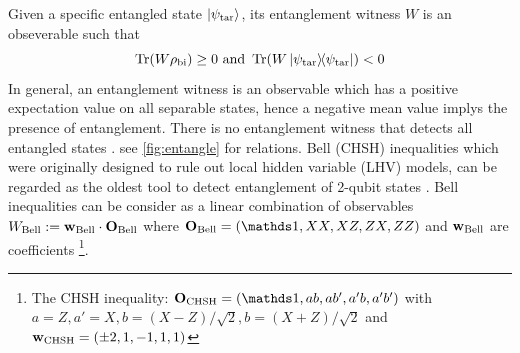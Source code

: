 \documentclass[
reprint,
aps,
pra,
floatfix,
]{revtex4-2}
\theoremstyle{plain}
\theoremstyle{definition}
\newtheorem{definition}{Definition}
\newtheorem{remark}{Remark}
\newcommand{\ew}{W}
\newcommand{\pob}{O}
\newcommand{\dm}{\rho}
\newcommand{\bi}{\text{bi}}
\newcommand{\target}{\textup{tar}}
\newcommand{\chsh}{\textup{CHSH}}
\newcommand{\bellineq}{\textup{Bell}}
\newcommand{\px}{X}
\newcommand{\pz}{Z}
\begin{document}
Given a specific entangled state $\ket{\psi_\target}$, its entanglement witness $\ew$ is an obseverable such that
\begin{equation}
	\Tr(\ew\dm_{\bi}) \ge 0  \text{ and }
	\Tr(\ew\op{\psi_{\target}}) < 0 
\end{equation}
In general, an entanglement witness is an observable which has a positive expectation value on all separable states, hence a negative mean value implys the presence of entanglement.
There is no entanglement witness that detects all entangled states \cite{heinosaariMathematicalLanguageQuantum2011}.
see \cref{fig:entangle} for relations.
Bell (CHSH) inequalities which were originally designed to rule out local hidden variable (LHV) models,
can be regarded as the oldest tool to detect entanglement of 2-qubit states \cite{terhalBellInequalitiesSeparability2000}.
Bell inequalities can be consider as a linear combination of observables $\ew_{\bellineq}:=\vb{w}_{\bellineq}\cdot\vb{\pob}_{\bellineq}$
where $\vb{\pob}_{\bellineq}=\qty(\identity, XX,XZ,ZX,ZZ )$ and $\vb{w}_{\bellineq}$ are coefficients
\footnote{
	The CHSH inequality:
	$\vb{\pob}_{\chsh}=\qty(\identity, a b, a b', a' b, a' b' )$ with 
	$a = \pz, a' = \px, b = (\px-\pz)/\sqrt{2}, b = (\px+\pz)/\sqrt{2}$
	and $\vb{w}_{\chsh} = \qty(\pm 2, 1, -1, 1, 1)$
}.
\end{document}
